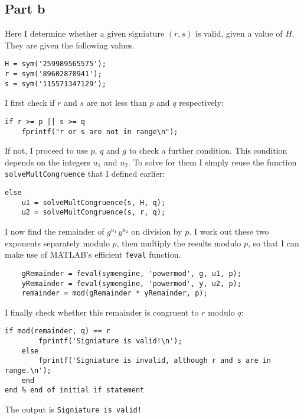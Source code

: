 \documentclass[11pt]{article}
\begin{document}
\subsection*{Part b}
Here I determine whether a given signiature $(r, s)$ is valid, given a value of $H$. They are given the following values.
\begin{Verbatim}[xleftmargin=0.5in]
H = sym('259989565575');
r = sym('89602878941');
s = sym('115571347129');
\end{Verbatim}
I first check if $r$ and $s$ are not less than $p$ and $q$ respectively:
\begin{Verbatim}[xleftmargin=0.5in]
if r >= p || s >= q
    fprintf("r or s are not in range\n");
\end{Verbatim}
If not, I proceed to use $p$, $q$ and $g$ to check a further condition. This condition depends on the integers $u_1$ and $u_2$. To solve for them I simply reuse the function \texttt{solveMultCongruence} that I defined earlier:
\begin{Verbatim}[xleftmargin=0.5in]
else
    u1 = solveMultCongruence(s, H, q);
    u2 = solveMultCongruence(s, r, q);
\end{Verbatim}
I now find the remainder of $g^{u_1} \, y^{u_2}$ on division by $p$. I work out these two exponents separately modulo $p$, then multiply the results modulo $p$, so that I can make use of MATLAB's efficient \texttt{feval} function.
\begin{Verbatim}[xleftmargin=0.5in]
    % by modular arithmetic, we can work out the remainders separately
    gRemainder = feval(symengine, 'powermod', g, u1, p);
    yRemainder = feval(symengine, 'powermod', y, u2, p);
    remainder = mod(gRemainder * yRemainder, p);
\end{Verbatim}
I finally check whether this remainder is congruent to $r$ modulo $q$:
\begin{Verbatim}[xleftmargin=0.5in]
    if mod(remainder, q) == r
        fprintf('Signiature is valid!\n');
    else
        fprintf('Signiature is invalid, although r and s are in range.\n');
    end
end % end of initial if statement
\end{Verbatim}
The output is \texttt{Signiature is valid!}
\end{document}
